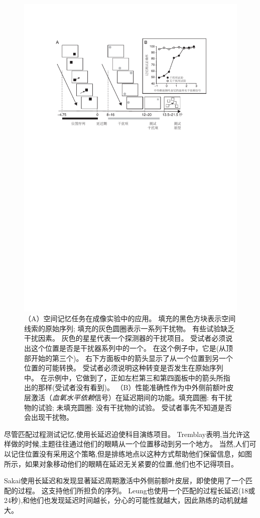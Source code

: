 \begin{figure}
	\centering
	\includegraphics[width=0.7\linewidth]{chap6/6_10}
	\caption{（A）空间记忆任务在成像实验中的应用。
		填充的黑色方块表示空间线索的原始序列; 填充的灰色圆圈表示一系列干扰物。
		有些试验缺乏干扰因素。
		灰色的星星代表一个探测器的干扰项目。
		受试者必须说出这个位置是否是干扰器系列中的一个。
		在这个例子中，它是(从顶部开始的第三个)。
		右下方面板中的箭头显示了从一个位置到另一个位置的可能转换。
		受试者必须说明这种转变是否发生在原始序列中。
		在示例中，它做到了，正如左栏第三和第四面板中的箭头所指出的那样(受试者没有看到)。
		（B）性能准确性作为中外侧前额叶皮层激活（\textit{血氧水平依赖}信号）在延迟期间的功能。填充圆圈: 有干扰物的试验; 未填充圆圈: 没有干扰物的试验。
		受试者事先不知道是否会出现干扰物\cite{sakai2002active}。}
	\label{fig:6_10}
\end{figure}


尽管匹配过程测试记忆,使用长延迟迫使科目演练项目。
Tremblay\cite{tremblay2006rehearsal}表明,当允许这样做的时候,主题往往通过他们的眼睛从一个位置移动到另一个地方。
当然,人们可以记住位置没有采用这个策略,但是排练地点以这种方式帮助他们保留信息，如图所示，如果对象移动他们的眼睛在延迟无关紧要的位置,他们也不记得项目\cite{guerard2009processing}。


Sakai\cite{sakai2002active}使用长延迟和发现显著延迟周期激活中外侧前额叶皮层，即使使用了一个匹配的过程。
这支持他们所担负的序列。
Leung\cite{leung2002sustained}也使用一个匹配的过程长延迟(18或24秒),和他们也发现延迟时间越长，分心的可能性就越大，因此熟练的动机就越大。



